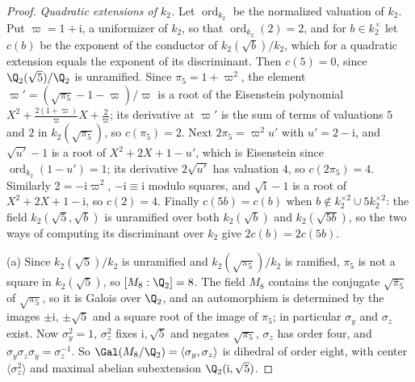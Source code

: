 \begin{proof}
\emph{Quadratic extensions of $k_2$.} Let $\operatorname{ord}_{k_2}$ be the
normalized valuation of $k_2$. Put $\varpi=1+\mathrm i$, a uniformizer of $k_2$,
so that $\operatorname{ord}_{k_2}(2)=2$, and for $b\in k_2^\times$ let $c(b)$ be the exponent of the
conductor of $k_2(\sqrt b)/k_2$, which for a quadratic extension equals the
exponent of its discriminant. Then $c(5)=0$, since $\Q_2(\sqrt5)/\Q_2$ is
unramified. Since $\pi_5=1+\varpi^2$, the element
$\varpi'=(\sqrt{\pi_5}-1-\varpi)/\varpi$ is a root of the Eisenstein
polynomial $X^2+\frac{2(1+\varpi)}\varpi X+\frac2\varpi$; its derivative at
$\varpi'$ is the sum of terms of valuations $5$ and $2$ in
$k_2(\sqrt{\pi_5})$, so $c(\pi_5)=2$. Next $2\pi_5=\varpi^2u'$ with
$u'=2-\mathrm i$, and $\sqrt{u'}-1$ is a root of $X^2+2X+1-u'$, which
is Eisenstein since $\operatorname{ord}_{k_2}(1-u')=1$; its derivative $2\sqrt{u'}$ has
valuation $4$, so $c(2\pi_5)=4$. Similarly $2=-\mathrm i\varpi^2$, $-\mathrm i\equiv\mathrm i$
modulo squares, and $\sqrt{\mathrm i}-1$ is a root of $X^2+2X+1-\mathrm i$, so $c(2)=4$.
Finally $c(5b)=c(b)$ when $b\notin k_2^{\times2}\cup5k_2^{\times2}$: the field
$k_2(\sqrt5,\sqrt b)$ is unramified over both $k_2(\sqrt b)$ and $k_2(\sqrt{5b})$,
so the two ways of computing its discriminant over $k_2$ give $2c(b)=2c(5b)$.

(a) Since $k_2(\sqrt5)/k_2$ is unramified and $k_2(\sqrt{\pi_5})/k_2$ is ramified,
$\pi_5$ is not a square in $k_2(\sqrt5)$, so $[M_8:\Q_2]=8$. The field $M_8$
contains the conjugate $\sqrt{\bar\pi_5}$ of $\sqrt{\pi_5}$, so it is Galois
over $\Q_2$, and an automorphism is determined by the images $\pm\mathrm i$,
$\pm\sqrt5$ and a square root of the image of $\pi_5$; in particular
$\sigma_y$ and $\sigma_z$ exist. Now $\sigma_y^2=1$, $\sigma_z^2$ fixes
$\mathrm i,\sqrt5$ and negates $\sqrt{\pi_5}$, $\sigma_z$ has order four, and
$\sigma_y\sigma_z\sigma_y=\sigma_z^{-1}$. So
$\Gal(M_8/\Q_2)=\langle\sigma_y,\sigma_z\rangle$ is dihedral of order eight,
with center $\langle\sigma_z^2\rangle$ and maximal abelian subextension
$\Q_2(\mathrm i,\sqrt5)$.


\end{proof}
